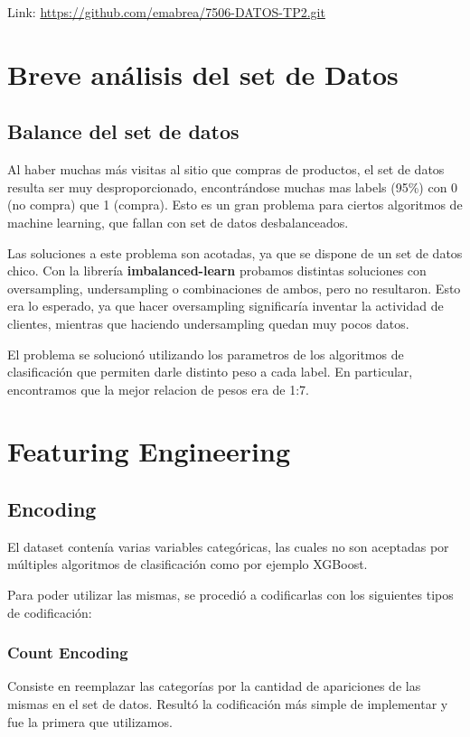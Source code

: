 \documentclass[a4paper ,12pt]{article}
\begin{document}
Link: \url{https://github.com/emabrea/7506-DATOS-TP2.git}

\newpage
\section{Breve análisis del set de Datos}
\subsection{Balance del set de datos}
Al haber muchas más visitas al sitio que compras de productos, el set de datos resulta ser muy desproporcionado, encontrándose muchas mas labels (95\%) con 0 (no compra) que 1 (compra). Esto es un gran problema para ciertos algoritmos de machine learning, que fallan con set de datos desbalanceados. 

Las soluciones a este problema son acotadas, ya que se dispone de un set de datos chico. Con la librería \textbf{imbalanced-learn} probamos distintas soluciones con oversampling, undersampling o combinaciones de ambos, pero no resultaron. 
Esto era lo esperado, ya que hacer oversampling significaría inventar la actividad de clientes, mientras que haciendo undersampling quedan muy pocos datos.

El problema se solucionó utilizando los parametros de los algoritmos de clasificación que permiten darle distinto peso a cada label. En particular, encontramos que la mejor relacion de pesos era de 1:7.



\newpage
\section{Featuring Engineering}

\subsection{Encoding}

El dataset contenía varias variables categóricas, las cuales no son aceptadas por
múltiples algoritmos de clasificación como por ejemplo XGBoost.

Para poder utilizar las mismas, se procedió a codificarlas con los siguientes tipos de
codificación:

\subsubsection{Count Encoding}
Consiste en reemplazar las categorías por la cantidad de
apariciones de las mismas en el set de datos. Resultó la codificación más simple de
implementar y fue la primera que utilizamos.
\end{document}
